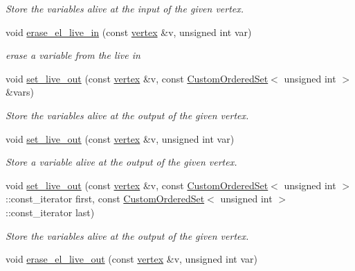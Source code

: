 \begin{DoxyCompactItemize}
\begin{DoxyCompactList}\small\item\em Store the variables alive at the input of the given vertex. \end{DoxyCompactList}\item 
void \hyperlink{classliveness_a55189aee9cff0fbc03524210c2f8f5e8}{erase\+\_\+el\+\_\+live\+\_\+in} (const \hyperlink{graph_8hpp_abefdcf0544e601805af44eca032cca14}{vertex} \&v, unsigned int var)
\begin{DoxyCompactList}\small\item\em erase a variable from the live in \end{DoxyCompactList}\item 
void \hyperlink{classliveness_adaebdad5db79d709d99b59d8c35f3d0e}{set\+\_\+live\+\_\+out} (const \hyperlink{graph_8hpp_abefdcf0544e601805af44eca032cca14}{vertex} \&v, const \hyperlink{classCustomOrderedSet}{Custom\+Ordered\+Set}$<$ unsigned int $>$ \&vars)
\begin{DoxyCompactList}\small\item\em Store the variables alive at the output of the given vertex. \end{DoxyCompactList}\item 
void \hyperlink{classliveness_a1089eafff6d5dac4ee2338817f6e8744}{set\+\_\+live\+\_\+out} (const \hyperlink{graph_8hpp_abefdcf0544e601805af44eca032cca14}{vertex} \&v, unsigned int var)
\begin{DoxyCompactList}\small\item\em Store a variable alive at the output of the given vertex. \end{DoxyCompactList}\item 
void \hyperlink{classliveness_a57fd8db659aa918263fdb67b40626d5a}{set\+\_\+live\+\_\+out} (const \hyperlink{graph_8hpp_abefdcf0544e601805af44eca032cca14}{vertex} \&v, const \hyperlink{classCustomOrderedSet}{Custom\+Ordered\+Set}$<$ unsigned int $>$\+::const\+\_\+iterator first, const \hyperlink{classCustomOrderedSet}{Custom\+Ordered\+Set}$<$ unsigned int $>$\+::const\+\_\+iterator last)
\begin{DoxyCompactList}\small\item\em Store the variables alive at the output of the given vertex. \end{DoxyCompactList}\item 
void \hyperlink{classliveness_add79631c33a2be95dafa5215f9df6770}{erase\+\_\+el\+\_\+live\+\_\+out} (const \hyperlink{graph_8hpp_abefdcf0544e601805af44eca032cca14}{vertex} \&v, unsigned int var)

\end{DoxyCompactItemize}
